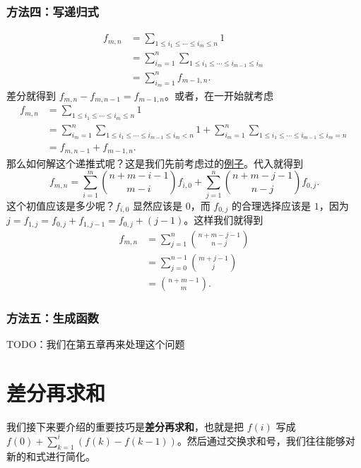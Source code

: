 \subsubsection*{方法四：写递归式}
    $$
    \begin{aligned}
    f_{m,n}&=\sum_{1\le i_1\le \cdots\le i_m\le n}1\\
    &=\sum_{i_m=1}^n\sum_{1\le i_1\le\cdots \le i_{m-1}\le i_m}\\
    &=\sum_{i_m=1}^n f_{m-1,n}.
    \end{aligned}
    $$
    差分就得到 $f_{m,n}-f_{m,n-1}=f_{m-1,n}$。或者，在一开始就考虑
    $$
    \begin{aligned}
    f_{m,n}&=\sum_{1\le i_1\le \cdots\le i_m\le n}1\\
    &=\sum_{i_m=1}^n\sum_{1\le i_1\le\cdots \le i_{m-1}\le i_m<n}1+\sum_{i_m=1}^n\sum_{1\le i_1\le\cdots \le i_{m-1}\le i_m=n}\\
    &=f_{m,n-1}+f_{m-1,n}.
    \end{aligned}
    $$
    那么如何解这个递推式呢？这是我们先前考虑过的\hyperref[example: 2d-recurrence]{例子}。代入就得到
    $$
    f_{m,n}=\sum_{i=1}^m\binom{n+m-i-1}{m-i}f_{i,0}+\sum_{j=1}^n \binom{n+m-j-1}{n-j}f_{0,j}.
    $$
    这个初值应该是多少呢？$f_{i,0}$ 显然应该是 $0$，而 $f_{0,j}$ 的合理选择应该是 $1$，因为 $j=f_{1,j}=f_{0,j}+f_{1,j-1}=f_{0,j}+(j-1)$。这样我们就得到
    $$
    \begin{aligned}
    f_{m,n}&=\sum_{j=1}^n \binom{n+m-j-1}{n-j}\\
        &=\sum_{j=0}^{n-1}\binom{m+j-1}{j}\\
        &=\binom{n+m-1}{m}.
    \end{aligned}
    $$

\subsubsection*{方法五：生成函数}
    TODO：我们在第五章再来处理这个问题

\section{差分再求和}

我们接下来要介绍的重要技巧是\textbf{差分再求和}，也就是把 $f(i)$ 写成 $f(0)+\sum_{k=1}^i (f(k)-f(k-1))$。然后通过交换求和号，我们往往能够对新的和式进行简化。


